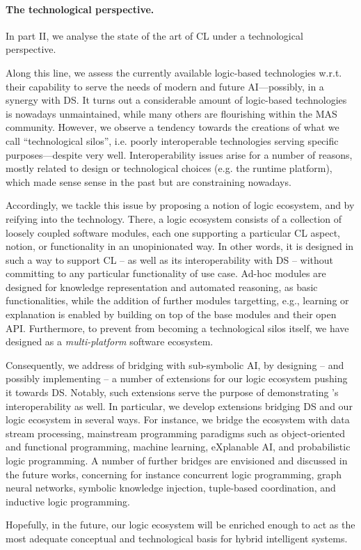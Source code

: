 \documentclass[12pt]{scrartcl}
\begin{document}
\paragraph{The technological perspective.}

In part II, we analyse the state of the art of CL under a technological perspective.

Along this line, we assess the currently available logic-based technologies w.r.t. their capability to serve the needs of modern and future AI---possibly, in a synergy with DS.
%
It turns out a considerable amount of logic-based technologies is nowadays unmaintained, while many others are flourishing within the MAS community.
%
However, we observe a tendency towards the creations of what we call ``technological silos'', i.e. poorly interoperable technologies serving specific purposes---despite very well.
%
Interoperability issues arise for a number of reasons, mostly related to design or technological choices (e.g. the runtime platform), which made sense sense in the past but are constraining nowadays.

Accordingly, we tackle this issue by proposing a notion of logic ecosystem, and by reifying into the \twopkt{} technology. %
%
There, a logic ecosystem consists of a collection of loosely coupled software modules, each one supporting a particular CL aspect, notion, or functionality in an unopinionated way.
%
In other words, it is designed in such a way to support CL -- as well as its interoperability with DS -- without committing to any particular functionality of use case.
%
Ad-hoc modules are designed for knowledge representation and automated reasoning, as basic functionalities, while the addition of further modules targetting, e.g., learning or explanation is enabled by building on top of the base modules and their open API.
%
Furthermore, to prevent \twopkt{} from becoming a technological silos itself, we have designed as a \emph{multi-platform} software ecosystem.

Consequently, we address of bridging \twopkt{} with sub-symbolic AI, by designing -- and possibly implementing -- a number of extensions for our logic ecosystem pushing it towards DS.
%
Notably, such extensions serve the purpose of demonstrating \twopkt{}'s interoperability as well.
%
In particular, we develop extensions bridging DS and our logic ecosystem in several ways.
%
For instance, we bridge the ecosystem with data stream processing, mainstream programming paradigms such as object-oriented and functional programming, machine learning, eXplanable AI, and probabilistic logic programming.
%
A number of further bridges are envisioned and discussed in the future works, concerning for instance concurrent logic programming, graph neural networks, symbolic knowledge injection, tuple-based coordination, and inductive logic programming.

Hopefully, in the future, our logic ecosystem will be enriched enough to act as the most adequate conceptual and technological basis for hybrid intelligent systems.
\end{document}
